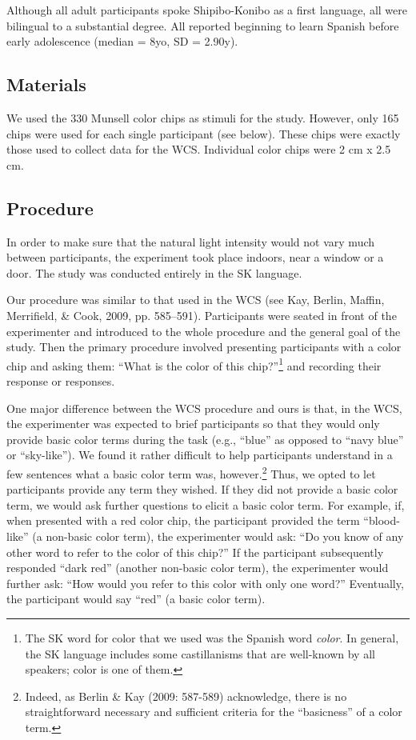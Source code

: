 \documentclass[,man,floatsintext]{apa6}
\let\rmarkdownfootnote\footnote%
\def\footnote{\protect\rmarkdownfootnote}
\theoremstyle{definition}
\theoremstyle{definition}
\theoremstyle{definition}
\theoremstyle{remark}
\begin{document}
Although all adult participants spoke Shipibo-Konibo as a first
language, all were bilingual to a substantial degree. All reported
beginning to learn Spanish before early adolescence (median = 8yo, SD =
2.90y).

\subsection{Materials}\label{materials}

We used the 330 Munsell color chips as stimuli for the study. However,
only 165 chips were used for each single participant (see below). These
chips were exactly those used to collect data for the WCS. Individual
color chips were 2 cm x 2.5 cm.

\subsection{Procedure}\label{procedure}

In order to make sure that the natural light intensity would not vary
much between participants, the experiment took place indoors, near a
window or a door. The study was conducted entirely in the SK language.

Our procedure was similar to that used in the WCS (see Kay, Berlin,
Maffin, Merrifield, \& Cook, 2009, pp. 585--591). Participants were
seated in front of the experimenter and introduced to the whole
procedure and the general goal of the study. Then the primary procedure
involved presenting participants with a color chip and asking them:
\enquote{What is the color of this chip?}\footnote{The SK word for color
  that we used was the Spanish word \emph{color}. In general, the SK
  language includes some castillanisms that are well-known by all
  speakers; color is one of them.} and recording their response or
responses.

One major difference between the WCS procedure and ours is that, in the
WCS, the experimenter was expected to brief participants so that they
would only provide basic color terms during the task (e.g.,
\enquote{blue} as opposed to \enquote{navy blue} or \enquote{sky-like}).
We found it rather difficult to help participants understand in a few
sentences what a basic color term was, however.\footnote{Indeed, as
  Berlin \& Kay (2009: 587-589) acknowledge, there is no straightforward
  necessary and sufficient criteria for the \enquote{basicness} of a
  color term.} Thus, we opted to let participants provide any term they
wished. If they did not provide a basic color term, we would ask further
questions to elicit a basic color term. For example, if, when presented
with a red color chip, the participant provided the term
\enquote{blood-like} (a non-basic color term), the experimenter would
ask: \enquote{Do you know of any other word to refer to the color of
this chip?} If the participant subsequently responded \enquote{dark red}
(another non-basic color term), the experimenter would further ask:
\enquote{How would you refer to this color with only one word?}
Eventually, the participant would say \enquote{red} (a basic color
term).
\end{document}
